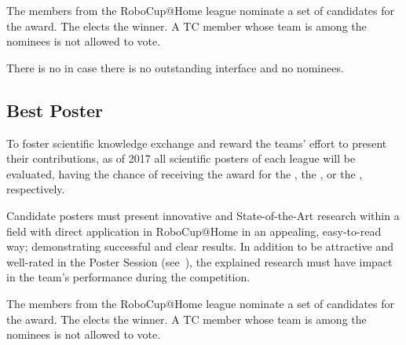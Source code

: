 The  members from the RoboCup@Home league 
nominate a set of candidates for the award. The  elects the winner. A TC member whose team is among the nominees 
is not allowed to vote.

There is no  in case there is no outstanding 
interface and no nominees.

\subsection{Best Poster}
\label{award:poster}
To foster scientific knowledge exchange and reward the teams' effort to present 
their contributions, as of 2017 all scientific posters of each league will be 
evaluated, having the chance of receiving the award for the , the , or the 
, respectively.

Candidate posters must present innovative and State-of-the-Art research within 
a field with direct application in RoboCup@Home in an appealing, easy-to-read 
way; demonstrating successful and clear results. In addition to be attractive 
and well-rated in the Poster Session (see~), 
the explained research must have impact in the team's performance during the 
competition.

The  members from the RoboCup@Home league 
nominate a set of candidates for the award. The  elects the winner. A TC member whose team is among the nominees 
is not allowed to vote.

%
%
%

